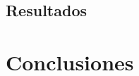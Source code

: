 \documentclass{iccmemoria}
\begin{document}
	\section{Resultados}
	

\chapter{Conclusiones}



	












%

%

%


%
\end{document}
